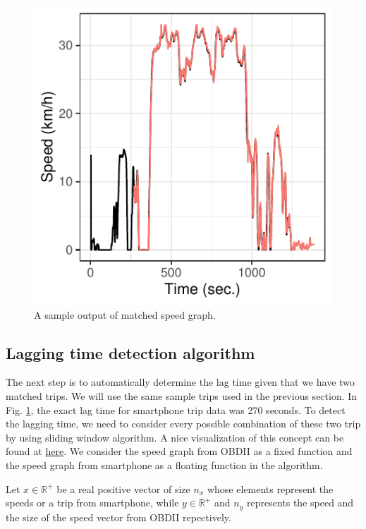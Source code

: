\documentclass[letterpaper,9pt,twocolumn,twoside,]{pinp}
\begin{document}
\begin{figure}

{\centering \includegraphics{report_issaclee_files/figure-latex/speedplot-1} 

}

\caption{A sample output of matched speed graph.}\label{fig:speedplot}
\end{figure}

\hypertarget{lagging-time-detection-algorithm}{%
\subsection{Lagging time detection
algorithm}\label{lagging-time-detection-algorithm}}

The next step is to automatically determine the lag time given that we
have two matched trips. We will use the same sample trips used in the
previous section. In Fig. \ref{fig:speedplot}, the exact lag time for
smartphone trip data was 270 seconds. To detect the lagging time, we
need to consider every possible combination of these two trip by using
sliding window algorithm. A nice visualization of this concept can be
found at
\href{https://en.wikipedia.org/wiki/Convolution\#/media/File:Convolution_of_spiky_function_with_box2.gif}{here}.
We consider the speed graph from OBDII as a fixed function and the speed
graph from smartphone as a floating function in the algorithm.

Let \(x \in \mathbb{R^{+}}\) be a real positive vector of size \(n_x\)
whose elements represent the speeds or a trip from smartphone, while
\(y \in \mathbb{R^{+}}\) and \(n_y\) represents the speed and the size
of the speed vector from OBDII repectively.
\end{document}
